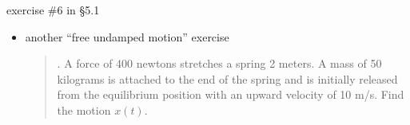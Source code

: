 \documentclass[dvipsnames,colorlinks]{beamer}
\begin{document}
\begin{frame}{exercise \#6 in \S5.1}

\begin{itemize}
\item another ``free undamped motion'' exercise

\medskip
\begin{quotation}
. A force of 400 newtons stretches a spring 2 meters.  A mass of 50 kilograms is attached to the end of the spring and is initially released from the equilibrium position with an upward velocity of 10 m/s.  Find the motion $x(t)$.
\end{quotation}
\end{itemize}

\vspace{40mm}
\end{frame}
\end{document}
